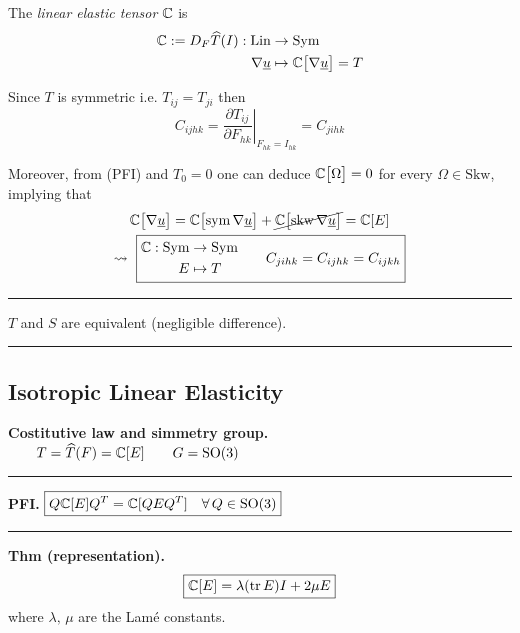 The \emph{linear elastic tensor} $\mathbb{C}$ is
\begin{align*}
\mathbb{C}:=D_F\widehat{T}(I):\text{Lin}&\to\text{Sym} \\
\nabla\underline{u}&\mapsto \mathbb{C}\big[\nabla\underline{u}\big]=T
\end{align*}

Since $T$ is symmetric i.e. $T_{ij}=T_{ji}$ then
\begin{equation*}
C_{ijhk}=\left.\frac{\partial T_{ij}}{\partial F_{hk}}\right|_{F_{hk}=I_{hk}} =C_{jihk}
\end{equation*}

Moreover, from (PFI) and $T_0=0$ one can deduce $\mathbb{C}\big[\Omega\big]=0$ for every $\Omega\in\text{Skw}$, implying that
\begin{gather*}
\mathbb{C}\big[\nabla\underline{u}\big]=\mathbb{C}\big[\text{sym}\,\nabla\underline{u}\big]+\cancel{\mathbb{C}\big[\text{skw}\,\nabla\underline{u}\big]}=\mathbb{C}[E] \\
\leadsto\ \boxed{
\begin{aligned}
\mathbb{C}:\text{Sym}&\to\text{Sym} \\
E&\mapsto T
\end{aligned}
\qquad C_{jihk}=C_{ijhk}=C_{ijkh}
}
\end{gather*}

\rule{0.31\textwidth}{0.2pt}
\smallskip

$T$ and $S$ are equivalent (negligible difference).

\rule{0.31\textwidth}{0.2pt}


\subsection{\texorpdfstring{\color{red}Isotropic Linear Elasticity}{}}


\textbf{Costitutive law and simmetry group.} \\
$\qquad T=\widehat{T}(F)=\mathbb{C}[E]\qquad G=\text{SO}(3)$

\rule{0.31\textwidth}{0.2pt}
\smallskip

\textbf{PFI.} $\boxed{Q\mathbb{C}[E]Q^T=\mathbb{C}[QEQ^T]\quad \forall\,Q\in\text{SO}(3)}$

\rule{0.31\textwidth}{0.2pt}
\smallskip

\textbf{Thm (representation).} 
\begin{equation*}
\boxed{\mathbb{C}[E]=\lambda(\text{tr}\,E)I+2\mu E}
\end{equation*}
where $\lambda,\,\mu$ are the Lamé constants.

